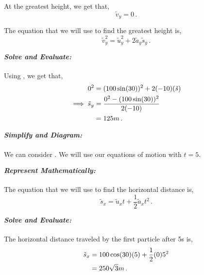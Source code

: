 \begin{subquestions}
At the greatest height, we get that,
\begin{equation}
	\tilde{v}_y = 0 \,.
\end{equation}

The equation that we will use to find the greatest height is,
\begin{equation}
	\tilde{v}_y^2 = \tilde{u}_y^2 + 2\tilde{a}_y\tilde{s}_y \,. \label{2008J:q6:SEqn1} 
\end{equation}




\textbf{\textit{Solve and Evaluate:}} \\ \\
Using , we get that,
\begin{align}
	0^2 & = (100\sin(30))^2 + 2(-10)(\tilde{s}) \nonumber \\
	\implies \tilde{s}_y & = \frac{0^2-(100\sin(30))^2}{2(-10)} \nonumber \\
		& = 125m \,.
\end{align}


\subquestion

\begin{subsubquestions}
	
\subsubquestion

\textbf{\textit{Simplify and Diagram:}} \\ \\
We can consider . We will use our equations of motion with $t=5$.




\textbf{\textit{Represent Mathematically:}} \\ \\			
The equation that we will use to find the horizontal distance is,
\begin{equation}
	\tilde{s}_x =\tilde{u}_xt + \frac{1}{2}\tilde{a}_xt^2 \,.	
\end{equation}




\textbf{\textit{Solve and Evaluate:}} \\ \\
The horizontal distance traveled by the first particle after 5s is,
\begin{align}
	\tilde{s}_x & = 100\cos(30)(5) + \frac{1}{2}(0)5^2 \nonumber \\
	    & = 250\sqrt{3}m \,.
\end{align}


\end{subsubquestions}
\end{subquestions}
